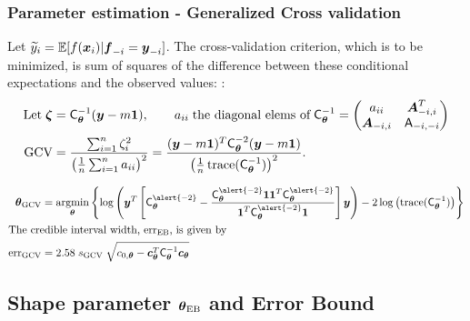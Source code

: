 \documentclass[handout, 10pt,compress,xcolor={usenames,dvipsnames}]{beamer} %
\newcommand{\bm}[1]{\boldsymbol{#1}}
\newcommand{\Ex}{\mathbb{E}}
\newcommand{\MLE}{\textup{EB}}
\newcommand{\GCV}{\textup{GCV}}
\newcommand{\mCtheta}{\mC_{\vtheta}}
\newcommand{\mCthetaInv}{{\mathsf{C}^{-1}_{\vtheta}}}
\newcommand{\vthetaMLE}{{\vtheta}_{\MLE}}
\newcommand{\err}{{\text{err}}}
\renewcommand{\ty}{\widetilde{y}}
\renewcommand{\vtheta}{{\bm{\theta}}}
\newcommand{\pause}{}
\begin{document}
\begin{frame}
	\frametitle{Parameter estimation - Generalized Cross validation}
	\vspace*{-5ex}
	Let $\ty_i = \Ex[f(\vx_i ) | \vf_{-i} = \vy_{-i}]$.
	The cross-validation criterion, which is to be minimized, is sum of squares of the difference between these conditional expectations and the observed values: :
	\vspace*{-2.0ex}
	\begin{align*}
	\text{Let}\; \bm{\zeta} &= \mCthetaInv(\vy - m \vone), 
	\qquad a_{ii} \; \text{the diagonal elems of} \; \mCthetaInv = \begin{pmatrix} a_{ii}  & \vA_{-i,i}^T \\  \vA_{-i,i} & \mA_{-i,-i}\end{pmatrix}
	\\
	\GCV &
	= \frac{\sum_{i=1}^n\zeta_i^2}{\left(\frac 1n \sum_{i=1}^n a_{ii} \right)^2} 
	= \frac{(\vy - m\vone)^T \mCtheta^{-2} (\vy - m \vone)}{\left(\frac 1n \trace(\mCthetaInv) \right)^2}.
	\end{align*}
	\pause
	\vspace{-2ex}
	\begin{align*}
	\vtheta_{\GCV} &= \argmin_{\vtheta} \left\{\log \left(  \vy^T \left[\mCtheta^{\alert{-2}} - \frac{\mCtheta^{\alert{-2}} \vone \vone^T \mCtheta^{\alert{-2}}}{\vone^T \mCtheta^{\alert{-2}} \vone}  \right] \vy \right)  
	- 2 \log \left ( \trace(\mCthetaInv) \right ) \right\}
	\\
	\intertext{The credible interval width, $\err_{\MLE}$, is given by}
	\err_{\GCV} & = 2.58 \; s_{\GCV} \; \sqrt{c_{0,\vtheta} - \vc_{\vtheta}^T\mCthetaInv\vc_{\vtheta} }
	\end{align*}
\end{frame}





\subsection{Shape parameter $\vthetaMLE$ and Error Bound}
\end{document}
